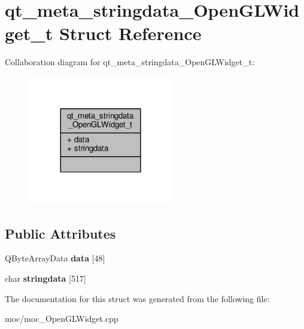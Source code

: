 \hypertarget{structqt__meta__stringdata___open_g_l_widget__t}{\section{qt\-\_\-meta\-\_\-stringdata\-\_\-\-Open\-G\-L\-Widget\-\_\-t Struct Reference}
\label{structqt__meta__stringdata___open_g_l_widget__t}
}


Collaboration diagram for qt\-\_\-meta\-\_\-stringdata\-\_\-\-Open\-G\-L\-Widget\-\_\-t\-:\nopagebreak
\begin{figure}[H]
\begin{center}
\leavevmode
\includegraphics[width=180pt]{structqt__meta__stringdata___open_g_l_widget__t__coll__graph}
\end{center}
\end{figure}
\subsection*{Public Attributes}
\begin{DoxyCompactItemize}
\item 
\hypertarget{structqt__meta__stringdata___open_g_l_widget__t_ad12a546ae59866732c758206e9e72938}{Q\-Byte\-Array\-Data {\bfseries data} \mbox{[}48\mbox{]}}\label{structqt__meta__stringdata___open_g_l_widget__t_ad12a546ae59866732c758206e9e72938}

\item 
\hypertarget{structqt__meta__stringdata___open_g_l_widget__t_a356daa95022344d6aa7de96775220623}{char {\bfseries stringdata} \mbox{[}517\mbox{]}}\label{structqt__meta__stringdata___open_g_l_widget__t_a356daa95022344d6aa7de96775220623}

\end{DoxyCompactItemize}


The documentation for this struct was generated from the following file\-:\begin{DoxyCompactItemize}
\item 
moc/moc\-\_\-\-Open\-G\-L\-Widget.\-cpp\end{DoxyCompactItemize}
